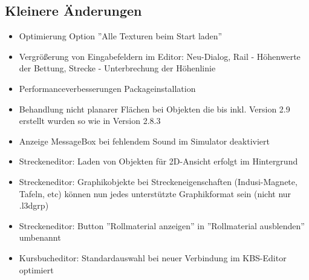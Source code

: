 \subsection{Kleinere Änderungen}
\begin{itemize}
\item Optimierung Option ''Alle Texturen beim Start laden''
\item Vergrößerung von Eingabefeldern im Editor: Neu-Dialog, Rail - Höhenwerte der Bettung, Strecke - Unterbrechung der Höhenlinie
\item Performanceverbesserungen Packageinstallation
\item Behandlung nicht planarer Flächen bei Objekten die bis inkl. Version 2.9 erstellt wurden so wie in Version 2.8.3
\item Anzeige MessageBox bei fehlendem Sound im Simulator deaktiviert

\item Streckeneditor: Laden von Objekten für 2D-Ansicht erfolgt im Hintergrund
\item Streckeneditor: Graphikobjekte bei Streckeneigenschaften (Indusi-Magnete, Tafeln, etc) können nun jedes unterstützte Graphikformat sein (nicht nur .l3dgrp)
\item Streckeneditor: Button ''Rollmaterial anzeigen'' in ''Rollmaterial ausblenden'' umbenannt

\item Kursbucheditor: Standardauswahl bei neuer Verbindung im KBS-Editor optimiert
\end{itemize}

